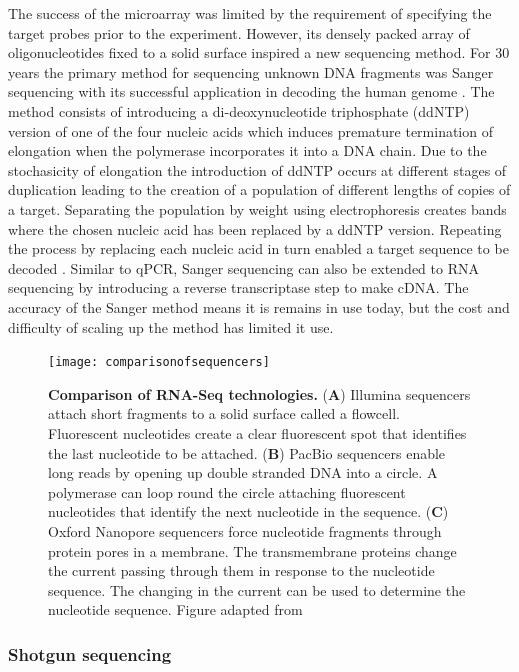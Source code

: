 \documentclass[../main.tex]{subfiles}
\begin{document}
The success of the microarray was limited by the requirement of specifying the target probes prior to the experiment.
However, its densely packed array of oligonucleotides fixed to a solid surface inspired a new sequencing method.
For 30 years the primary method for sequencing unknown DNA fragments was Sanger sequencing with its successful application in decoding the human genome \parencite{Lander2001}. 
The method consists of introducing a di-deoxynucleotide triphosphate (ddNTP) version of one of the four nucleic acids which induces premature termination of elongation when the polymerase incorporates it into a DNA chain.
Due to the stochasicity of elongation the introduction of ddNTP occurs at different stages of duplication leading to the creation of a population of different lengths of copies of a target.
Separating the population by weight using electrophoresis creates bands where the chosen nucleic acid has been replaced by a ddNTP version.
Repeating the process by replacing each nucleic acid in turn enabled a target sequence to be decoded \parencite{Sanger1977}.
Similar to qPCR, Sanger sequencing can also be extended to RNA sequencing by introducing a reverse transcriptase step to make cDNA.
The accuracy of the Sanger method means it is remains in use today, but the cost and difficulty of scaling up the method has limited it use.

\begin{figure}[h]

{\centering \texttt{[image: comparisonofsequencers]} 

}

\caption[Comparison of RNA-Seq technologies.]{\textbf{Comparison of RNA-Seq technologies.} (\textbf{A}) Illumina sequencers attach short fragments to a solid surface called a flowcell. Fluorescent nucleotides create a clear fluorescent spot that identifies the last nucleotide to be attached. (\textbf{B}) PacBio sequencers enable long reads by opening up double stranded DNA into a circle. A polymerase can loop round the circle attaching fluorescent nucleotides that identify the next nucleotide in the sequence. (\textbf{C}) Oxford Nanopore sequencers force nucleotide fragments through protein pores in a membrane. The transmembrane proteins change the current passing through them in response to the nucleotide sequence. The changing in the current can be used to determine the nucleotide sequence. Figure adapted from \cite{Stark2019}}\label{fig:rna-seq-tech}
\end{figure}

\subsubsection{Shotgun sequencing}
\end{document}
